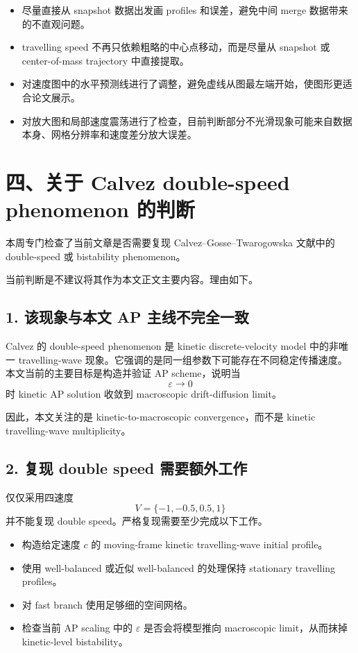 \documentclass[11pt]{ctexart}
\begin{document}
\begin{itemize}[leftmargin=2em]
    \item 尽量直接从 snapshot 数据出发画 profiles 和误差，避免中间 merge 数据带来的不直观问题。
    \item travelling speed 不再只依赖粗略的中心点移动，而是尽量从 snapshot 或 center-of-mass trajectory 中直接提取。
    \item 对速度图中的水平预测线进行了调整，避免虚线从图最左端开始，使图形更适合论文展示。
    \item 对放大图和局部速度震荡进行了检查，目前判断部分不光滑现象可能来自数据本身、网格分辨率和速度差分放大误差。
\end{itemize}

\section*{四、关于 Calvez double-speed phenomenon 的判断}

本周专门检查了当前文章是否需要复现 Calvez--Gosse--Twarogowska 文献中的 double-speed 或 bistability phenomenon。

当前判断是不建议将其作为本文正文主要内容。理由如下。

\subsection*{1. 该现象与本文 AP 主线不完全一致}

Calvez 的 double-speed phenomenon 是 kinetic discrete-velocity model 中的非唯一 travelling-wave 现象。它强调的是同一组参数下可能存在不同稳定传播速度。本文当前的主要目标是构造并验证 AP scheme，说明当
\[
\varepsilon\to0
\]
时 kinetic AP solution 收敛到 macroscopic drift-diffusion limit。

因此，本文关注的是 kinetic-to-macroscopic convergence，而不是 kinetic travelling-wave multiplicity。

\subsection*{2. 复现 double speed 需要额外工作}

仅仅采用四速度
\[
V=\{-1,-0.5,0.5,1\}
\]
并不能复现 double speed。严格复现需要至少完成以下工作。

\begin{itemize}[leftmargin=2em]
    \item 构造给定速度 \(c\) 的 moving-frame kinetic travelling-wave initial profile。
    \item 使用 well-balanced 或近似 well-balanced 的处理保持 stationary travelling profiles。
    \item 对 fast branch 使用足够细的空间网格。
    \item 检查当前 AP scaling 中的 \(\varepsilon\) 是否会将模型推向 macroscopic limit，从而抹掉 kinetic-level bistability。
\end{itemize}
\end{document}
